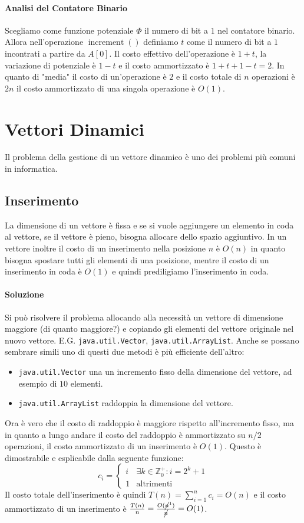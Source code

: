        \paragraph{Analisi del Contatore Binario} Scegliamo come funzione potenziale $\Phi$ il numero di bit a $1$ nel contatore binario. Allora nell'operazione $\operatorname{increment}()$ definiamo $t$ come il numero di bit a $1$ incontrati a partire da $A[0]$. Il costo effettivo dell'operazione è $1+t$, la variazione di potenziale è $1-t$ e il costo ammortizzato è $1+t+1-t=2$. In quanto di "media" il costo di un'operazione è $2$ e il costo totale di $n$ operazioni è $2n$ il costo ammortizzato di una singola operazione è $O(1)$.
\section{Vettori Dinamici}
    Il problema della gestione di un vettore dinamico è uno dei problemi più comuni in informatica. 
    \subsection{Inserimento}
        La dimensione di un vettore è fissa e se si vuole aggiungere un elemento in coda al vettore, se il vettore è pieno, bisogna allocare dello spazio aggiuntivo. 
        In un vettore inoltre il costo di un inserimento nella posizione $n$ è $O(n)$ in quanto bisogna spostare tutti gli elementi di una posizione, mentre il costo di un inserimento in coda è $O(1)$ e quindi prediligiamo l'inserimento in coda.
        \paragraph{Soluzione} Si può risolvere il problema allocando alla necessità un vettore di dimensione maggiore (di quanto maggiore?) e copiando gli elementi del vettore originale nel nuovo vettore. E.G. \texttt{java.util.Vector}, \texttt{java.util.ArrayList}.\newline
        Anche se possano sembrare simili uno di questi due metodi è più efficiente dell'altro: \begin{itemize}
            \item \texttt{java.util.Vector} una un incremento fisso della dimensione del vettore, ad esempio di $10$ elementi.
            \item \texttt{java.util.ArrayList} raddoppia la dimensione del vettore.
        \end{itemize}
        Ora è vero che il costo di raddoppio è maggiore rispetto all'incremento fisso, ma in quanto a lungo andare il costo del raddoppio è ammortizzato su $n/2$ operazioni, il costo ammortizzato di un inserimento è $O(1)$. Questo è dimostrabile e esplicabile dalla seguente funzione:
        $$
            c_i=\begin{cases}
                i & \exists k\in\mathbb{Z}_0^+:i=2^k+1\\
                1 & \text{altrimenti}
            \end{cases}
        $$
        Il costo totale dell'inserimento è quindi $T(n)=\sum_{i=1}^{n}c_i=O(n)$ e il costo ammortizzato di un inserimento è $\frac{T(n)}n=\frac{O(\cancel{n}^1)}{\cancel{n}}=O(1)$.
